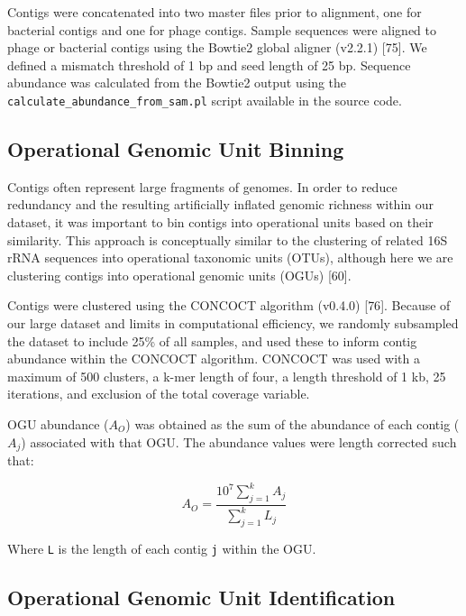 \documentclass[12pt,]{article}
\begin{document}
Contigs were concatenated into two master files prior to alignment, one
for bacterial contigs and one for phage contigs. Sample sequences were
aligned to phage or bacterial contigs using the Bowtie2 global aligner
(v2.2.1) {[}75{]}. We defined a mismatch threshold of 1 bp and seed
length of 25 bp. Sequence abundance was calculated from the Bowtie2
output using the \texttt{calculate\_abundance\_from\_sam.pl} script
available in the source code.

\subsection{Operational Genomic Unit
Binning}\label{operational-genomic-unit-binning}

Contigs often represent large fragments of genomes. In order to reduce
redundancy and the resulting artificially inflated genomic richness
within our dataset, it was important to bin contigs into operational
units based on their similarity. This approach is conceptually similar
to the clustering of related 16S rRNA sequences into operational
taxonomic units (OTUs), although here we are clustering contigs into
operational genomic units (OGUs) {[}60{]}.

Contigs were clustered using the CONCOCT algorithm (v0.4.0) {[}76{]}.
Because of our large dataset and limits in computational efficiency, we
randomly subsampled the dataset to include 25\% of all samples, and used
these to inform contig abundance within the CONCOCT algorithm. CONCOCT
was used with a maximum of 500 clusters, a k-mer length of four, a
length threshold of 1 kb, 25 iterations, and exclusion of the total
coverage variable.

OGU abundance (\(A_{O}\)) was obtained as the sum of the abundance of
each contig (\(A_{j}\)) associated with that OGU. The abundance values
were length corrected such that:

\[ { A }_{ O }=\frac { { 10 }^{ 7 }\sum _{ j=1 }^{ k }{ { A }_{ j } }  }{ \sum _{ j=1 }^{ k }{ { L }_{ j } }  } \]

Where \texttt{L} is the length of each contig \texttt{j} within the OGU.

\subsection{Operational Genomic Unit
Identification}\label{operational-genomic-unit-identification}
\end{document}
